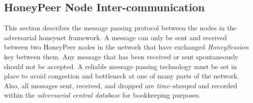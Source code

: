 \documentclass[grad,lot,lof,11pt,oneside,onehalfspace]{RUthesis}
\begin{document}
\subsection{HoneyPeer Node Inter-communication} This section describes the message passing protocol between the nodes in the adversarial honeynet framework. A message can only be sent and received between two HoneyPeer nodes in the network that have exchanged \textit{HoneySession} key between them. Any message that has been received or sent spontaneously should not be accepted. A reliable message passing technology must be set in place to avoid congestion and bottleneck at one of many parts of the network. Also, all messages sent, received, and dropped are \textit{time-stamped} and recorded within the \textit{adversarial central database} for bookkeeping purposes. 
\end{document}
